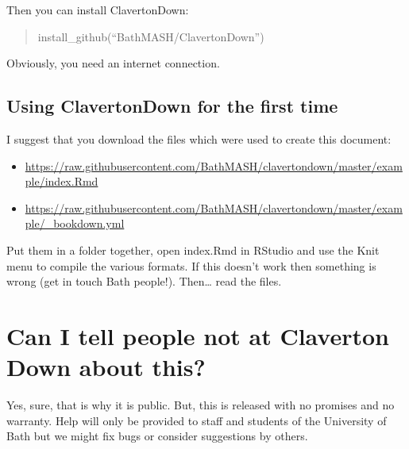 \documentclass[
  10pt,
  english,
  a4paper]{article}
\providecommand{\tightlist}{%
  \setlength{\itemsep}{0pt}\setlength{\parskip}{0pt}}
\theoremstyle{plain}
\theoremstyle{definition}
\theoremstyle{plain}
\theoremstyle{plain}
\theoremstyle{plain}
\theoremstyle{plain}
\theoremstyle{plain}
\theoremstyle{definition}
\theoremstyle{definition}
\theoremstyle{remark}
\theoremstyle{remark}
\begin{document}
Then you can install ClavertonDown:

\begin{quote}
install\_github(``BathMASH/ClavertonDown'')
\end{quote}

Obviously, you need an internet connection.

\hypertarget{using-clavertondown-for-the-first-time}{%
\subsection{Using ClavertonDown for the first time}\label{using-clavertondown-for-the-first-time}}

I suggest that you download the files which were used to create this document:

\begin{itemize}
\tightlist
\item
  \url{https://raw.githubusercontent.com/BathMASH/clavertondown/master/example/index.Rmd}
\item
  \url{https://raw.githubusercontent.com/BathMASH/clavertondown/master/example/_bookdown.yml}
\end{itemize}

Put them in a folder together, open index.Rmd in RStudio and use the Knit menu to compile the various formats. If this doesn't work then something is wrong (get in touch Bath people!). Then\ldots{} read the files.

\hypertarget{can-i-tell-people-not-at-claverton-down-about-this}{%
\section{Can I tell people not at Claverton Down about this?}\label{can-i-tell-people-not-at-claverton-down-about-this}}

Yes, sure, that is why it is public. But, this is released with no promises and no warranty. Help will only be provided to staff and students of the University of Bath but we might fix bugs or consider suggestions by others.
\end{document}

